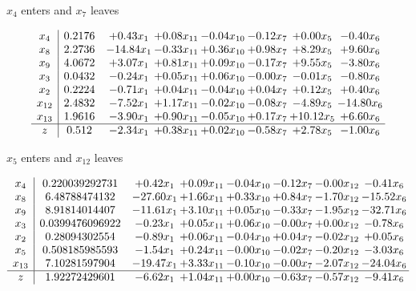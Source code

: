 \documentclass[8pt]{article}
\begin{document}
 $ x_{4} $ enters and $ x_{7} $ leaves 

 \[\begin{array}{c| c c@{\hskip 2pt} c@{\hskip 2pt} c@{\hskip 2pt} c@{\hskip 2pt} c@{\hskip 2pt} c@{\hskip 2pt} }
 x_{4}   &  0.2176 & +  0.43 x_{1} & +  0.08 x_{11} & -0.04 x_{10} & -0.12 x_{7} & +  0.00 x_{5} & -0.40 x_{6}\\
 x_{8}   &  2.2736 & -14.84 x_{1} & -0.33 x_{11} & +  0.36 x_{10} & +  0.98 x_{7} & +  8.29 x_{5} & +  9.60 x_{6}\\
 x_{9}   &  4.0672 & +  3.07 x_{1} & +  0.81 x_{11} & +  0.09 x_{10} & -0.17 x_{7} & +  9.55 x_{5} & -3.80 x_{6}\\
 x_{3}   &  0.0432 & -0.24 x_{1} & +  0.05 x_{11} & +  0.06 x_{10} & -0.00 x_{7} & -0.01 x_{5} & -0.80 x_{6}\\
 x_{2}   &  0.2224 & -0.71 x_{1} & +  0.04 x_{11} & -0.04 x_{10} & +  0.04 x_{7} & +  0.12 x_{5} & +  0.40 x_{6}\\
 x_{12}   &  2.4832 & -7.52 x_{1} & +  1.17 x_{11} & -0.02 x_{10} & -0.08 x_{7} & -4.89 x_{5} & -14.80 x_{6}\\
 x_{13}   &  1.9616 & -3.90 x_{1} & +  0.90 x_{11} & -0.05 x_{10} & +  0.17 x_{7} & + 10.12 x_{5} & +  6.60 x_{6}\\
\hline
z    &  0.512 & -2.34 x_{1} & +  0.38 x_{11} & +  0.02 x_{10} & -0.58 x_{7} & +  2.78 x_{5} & -1.00 x_{6}\\
\end{array}\]


 $ x_{5} $ enters and $ x_{12} $ leaves 

 \[\begin{array}{c| c c@{\hskip 2pt} c@{\hskip 2pt} c@{\hskip 2pt} c@{\hskip 2pt} c@{\hskip 2pt} c@{\hskip 2pt} }
 x_{4}   &  0.220039292731 & +  0.42 x_{1} & +  0.09 x_{11} & -0.04 x_{10} & -0.12 x_{7} & -0.00 x_{12} & -0.41 x_{6}\\
 x_{8}   &  6.48788474132 & -27.60 x_{1} & +  1.66 x_{11} & +  0.33 x_{10} & +  0.84 x_{7} & -1.70 x_{12} & -15.52 x_{6}\\
 x_{9}   &  8.91814014407 & -11.61 x_{1} & +  3.10 x_{11} & +  0.05 x_{10} & -0.33 x_{7} & -1.95 x_{12} & -32.71 x_{6}\\
 x_{3}   &  0.0399476096922 & -0.23 x_{1} & +  0.05 x_{11} & +  0.06 x_{10} & -0.00 x_{7} & +  0.00 x_{12} & -0.78 x_{6}\\
 x_{2}   &  0.28094302554 & -0.89 x_{1} & +  0.06 x_{11} & -0.04 x_{10} & +  0.04 x_{7} & -0.02 x_{12} & +  0.05 x_{6}\\
 x_{5}   &  0.508185985593 & -1.54 x_{1} & +  0.24 x_{11} & -0.00 x_{10} & -0.02 x_{7} & -0.20 x_{12} & -3.03 x_{6}\\
 x_{13}   &  7.10281597904 & -19.47 x_{1} & +  3.33 x_{11} & -0.10 x_{10} & -0.00 x_{7} & -2.07 x_{12} & -24.04 x_{6}\\
\hline
z    &  1.92272429601 & -6.62 x_{1} & +  1.04 x_{11} & +  0.00 x_{10} & -0.63 x_{7} & -0.57 x_{12} & -9.41 x_{6}\\
\end{array}\]
\end{document}
